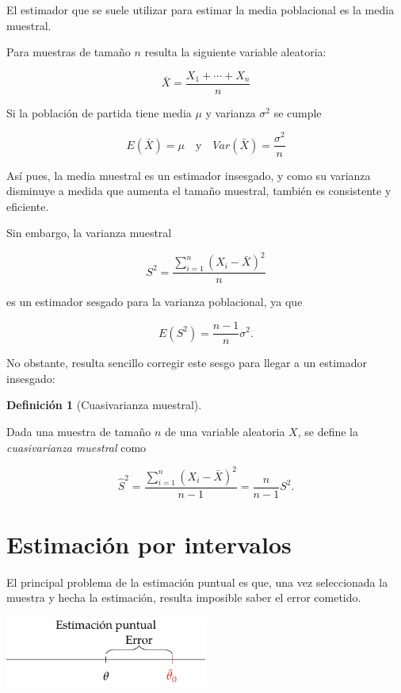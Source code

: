 \documentclass[
  a4paper,
]{scrreport}
\theoremstyle{plain}
\theoremstyle{definition}
\newtheorem{definition}{Definición}[chapter]
\theoremstyle{definition}
\theoremstyle{remark}
\begin{document}
El estimador que se suele utilizar para estimar la media poblacional es
la media muestral.

Para muestras de tamaño \(n\) resulta la siguiente variable aleatoria:

\[
\bar X = \frac{X_1+\cdots+X_n}{n}
\]

Si la población de partida tiene media \(\mu\) y varianza \(\sigma^2\)
se cumple

\[
E(\bar X) = \mu \quad \mbox{y} \quad Var(\bar X)=\frac{\sigma^2}{n}
\]

Así pues, la media muestral es un estimador insesgado, y como su
varianza disminuye a medida que aumenta el tamaño muestral, también es
consistente y eficiente.

Sin embargo, la varianza muestral

\[
S^2 = \frac{\sum_{i=1}^n (X_i-\bar X)^2}{n}
\]

es un estimador sesgado para la varianza poblacional, ya que

\[
E(S^2)= \frac{n-1}{n}\sigma^2.
\]

No obstante, resulta sencillo corregir este sesgo para llegar a un
estimador insesgado:

\begin{definition}[Cuasivarianza
muestral]\protect\hypertarget{def-cuasivarianza-muestral}{}\label{def-cuasivarianza-muestral}

Dada una muestra de tamaño \(n\) de una variable aleatoria \(X\), se
define la \emph{cuasivarianza muestral} como

\[
\hat{S}^2 = \frac{\sum_{i=1}^n (X_i-\bar X)^2}{n-1} = \frac{n}{n-1}S^2.
\]

\end{definition}

\section{Estimación por intervalos}\label{estimaciuxf3n-por-intervalos}

El principal problema de la estimación puntual es que, una vez
seleccionada la muestra y hecha la estimación, resulta imposible saber
el error cometido.

\begin{center}
\includegraphics[width=0.5\textwidth,height=\textheight]{img/estimacion/error-estimacion-puntual.pdf}
\end{center}
\end{document}
